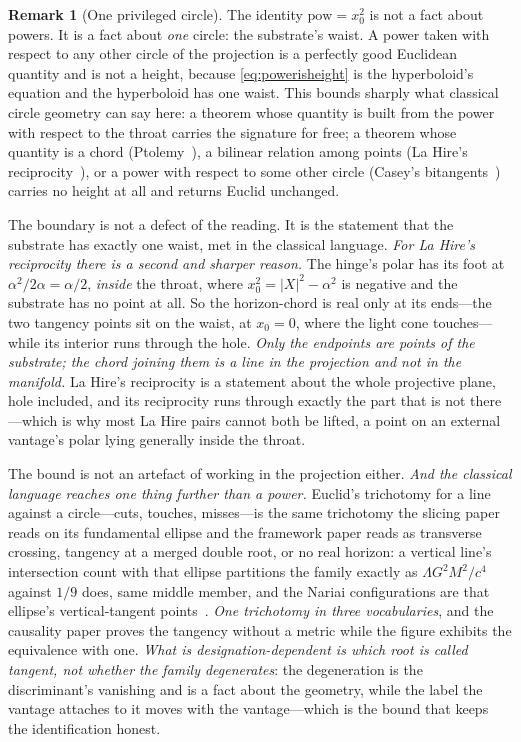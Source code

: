 \documentclass[11pt,a4paper]{article}
\theoremstyle{definition}
\newtheorem{remark}[theorem]{Remark}
\begin{document}
\begin{remark}[One privileged circle]\label{rem:onecircle}
The identity $\mathrm{pow}=x_{0}^{2}$ is not a fact about powers. It is a fact
about \emph{one} circle: the substrate's waist. A power taken with respect to any
other circle of the projection is a perfectly good Euclidean quantity and is not
a height, because \eqref{eq:powerisheight} is the hyperboloid's equation and the
hyperboloid has one waist. This bounds sharply what classical circle geometry can
say here: a theorem whose quantity is built from the power with respect to the
throat carries the signature for free; a theorem whose quantity is a chord
(Ptolemy~\cite{CoxeterGreitzer1967}), a bilinear relation among points (La
Hire's reciprocity~\cite{Coxeter1987b}), or a power with respect to some other
circle (Casey's bitangents~\cite{Casey1866}) carries no height at all
and returns Euclid unchanged. 

The boundary is not a defect of the reading. It is
the statement that the substrate has exactly one waist, met in the classical
language. \emph{For La Hire's reciprocity there is a second and sharper reason.} The
hinge's polar has its foot at $\alpha^{2}/2\alpha=\alpha/2$, \emph{inside} the throat, where
$x_0^{2}=|X|^{2}-\alpha^{2}$ is negative and the substrate has no point at all. So the horizon-chord is
real only at its ends---the two tangency points sit on the waist, at $x_0=0$, where the light cone
touches---while its interior runs through the hole. \emph{Only the endpoints are points of the
substrate; the chord joining them is a line in the projection and not in the manifold.} La Hire's
reciprocity is a statement about the whole projective plane, hole included, and its reciprocity runs
through exactly the part that is not there---which is why most La Hire pairs cannot both be lifted, a
point on an external vantage's polar lying generally inside the throat. 

The bound is not an artefact of working in the projection either.
\emph{And the classical language reaches one thing further than a power.} Euclid's trichotomy for a line against a circle---cuts, touches, misses---is the same trichotomy the slicing paper reads on its fundamental ellipse and the framework paper reads as transverse crossing, tangency at a merged double root, or no real horizon: a vertical line's intersection count with that ellipse partitions the family exactly as $\Lambda G^{2}M^{2}/c^{4}$ against $1/9$ does, same middle member, and the Nariai configurations are that ellipse's vertical-tangent points~\cite{JanzenSlicing,JanzenCRframework}. \emph{One trichotomy in three vocabularies}, and the causality paper proves the tangency without a metric while the figure exhibits the equivalence with one. \emph{What is designation-dependent is which root is called tangent, not whether the family degenerates}: the degeneration is the discriminant's vanishing and is a fact about the geometry, while the label the vantage attaches to it moves with the vantage---which is the bound that keeps the identification honest. 


\end{remark}
\end{document}
